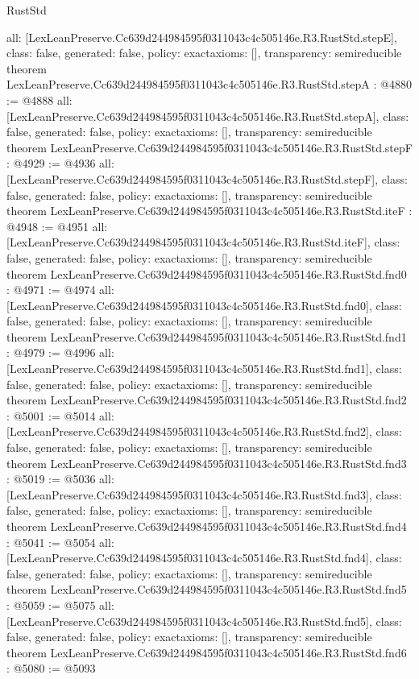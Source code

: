 \begin{lexlean}{RustStd}
\begin{coremodule}
{  all: [LexLeanPreserve.Cc639d244984595f0311043c4c505146e.R3.RustStd.stepE],
  class: false,
  generated: false,
  policy: exact{axioms: []},
  transparency: semireducible
}
theorem LexLeanPreserve.Cc639d244984595f0311043c4c505146e.R3.RustStd.stepA : @4880 := @4888 {
  all: [LexLeanPreserve.Cc639d244984595f0311043c4c505146e.R3.RustStd.stepA],
  class: false,
  generated: false,
  policy: exact{axioms: []},
  transparency: semireducible
}
theorem LexLeanPreserve.Cc639d244984595f0311043c4c505146e.R3.RustStd.stepF : @4929 := @4936 {
  all: [LexLeanPreserve.Cc639d244984595f0311043c4c505146e.R3.RustStd.stepF],
  class: false,
  generated: false,
  policy: exact{axioms: []},
  transparency: semireducible
}
theorem LexLeanPreserve.Cc639d244984595f0311043c4c505146e.R3.RustStd.iteF : @4948 := @4951 {
  all: [LexLeanPreserve.Cc639d244984595f0311043c4c505146e.R3.RustStd.iteF],
  class: false,
  generated: false,
  policy: exact{axioms: []},
  transparency: semireducible
}
theorem LexLeanPreserve.Cc639d244984595f0311043c4c505146e.R3.RustStd.fnd0 : @4971 := @4974 {
  all: [LexLeanPreserve.Cc639d244984595f0311043c4c505146e.R3.RustStd.fnd0],
  class: false,
  generated: false,
  policy: exact{axioms: []},
  transparency: semireducible
}
theorem LexLeanPreserve.Cc639d244984595f0311043c4c505146e.R3.RustStd.fnd1 : @4979 := @4996 {
  all: [LexLeanPreserve.Cc639d244984595f0311043c4c505146e.R3.RustStd.fnd1],
  class: false,
  generated: false,
  policy: exact{axioms: []},
  transparency: semireducible
}
theorem LexLeanPreserve.Cc639d244984595f0311043c4c505146e.R3.RustStd.fnd2 : @5001 := @5014 {
  all: [LexLeanPreserve.Cc639d244984595f0311043c4c505146e.R3.RustStd.fnd2],
  class: false,
  generated: false,
  policy: exact{axioms: []},
  transparency: semireducible
}
theorem LexLeanPreserve.Cc639d244984595f0311043c4c505146e.R3.RustStd.fnd3 : @5019 := @5036 {
  all: [LexLeanPreserve.Cc639d244984595f0311043c4c505146e.R3.RustStd.fnd3],
  class: false,
  generated: false,
  policy: exact{axioms: []},
  transparency: semireducible
}
theorem LexLeanPreserve.Cc639d244984595f0311043c4c505146e.R3.RustStd.fnd4 : @5041 := @5054 {
  all: [LexLeanPreserve.Cc639d244984595f0311043c4c505146e.R3.RustStd.fnd4],
  class: false,
  generated: false,
  policy: exact{axioms: []},
  transparency: semireducible
}
theorem LexLeanPreserve.Cc639d244984595f0311043c4c505146e.R3.RustStd.fnd5 : @5059 := @5075 {
  all: [LexLeanPreserve.Cc639d244984595f0311043c4c505146e.R3.RustStd.fnd5],
  class: false,
  generated: false,
  policy: exact{axioms: []},
  transparency: semireducible
}
theorem LexLeanPreserve.Cc639d244984595f0311043c4c505146e.R3.RustStd.fnd6 : @5080 := @5093 {
}
\end{coremodule}
\end{lexlean}

